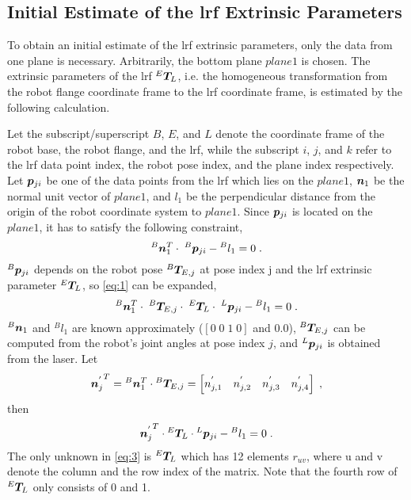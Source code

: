 \subsection{Initial Estimate of the \ac{lrf} Extrinsic Parameters}
\label{sec:first_step}
To obtain an initial estimate of the \ac{lrf} extrinsic parameters, only the data from one plane is necessary. Arbitrarily, the bottom plane $plane 1$ is chosen. The extrinsic parameters of the \ac{lrf} ${^E}\vb*{T}_L$, i.e. the homogeneous transformation from the robot flange coordinate frame to the \ac{lrf} coordinate frame, is estimated by the following calculation. 

Let the subscript/superscript $B$, $E$, and $L$ denote the coordinate frame of the robot base, the robot flange, and the \ac{lrf}, while the subscript $i$, $j$, and $k$ refer to the \ac{lrf} data point index, the robot pose index, and the plane index respectively. Let $\vb*{p}_{ji}$ be one of the data points from the \ac{lrf} which lies on the $plane 1$, $\vb*{n}_1$ be the normal unit vector of $plane 1$, and $l_1$ be the perpendicular distance from the origin of the robot coordinate system to $plane 1$.  Since $\vb*{p}_{ji}$ is located on the $plane 1$, it has to satisfy the following constraint, 
  \begin{equation}
  \label{eq:1}
  {^B}\vb*{n}_1 ^T \cdot\; {^B}\vb*{p}_{ji}  - {^B}l_1 = 0 \; .
   \end{equation}
${^B}\vb*{p}_{ji}$ depends on the robot pose ${^B}\vb*{T}_{E,j}$ at pose index j and the \ac{lrf} extrinsic parameter ${^E}\vb*{T}_L$, so \eqref{eq:1}  can be expanded,
  \begin{equation}
  {{^B}\vb*{n}_1 ^{T}} \cdot\; {^B}\vb*{T}_{E,j} \cdot \; {^E}\vb*{T}_L \cdot \; {^L}\vb*{p}_{ji}  - {^B}l_1 = 0 \; .
  \end{equation}
${^B}\vb*{n}_1$ and $^{B}l_1$ are known approximately ($[0 \; 0\; 1\;0]$ and $0.0$), ${^B}\vb*{T}_{E,j}$ can be computed from the robot's joint angles at pose index $j$, and ${^L}\vb*{p}_{ji}$ is obtained from the laser. Let 
\begin{equation}
{\vb*{n}_j^{'}}^{T} = {^B}\vb*{n}_1 ^T \cdot {^B}\vb*{T}_{E,j} = 
\left[n^{'}_{j,1} \quad n^{'}_{j,2} \quad n^{'}_{j,3}  \quad n^{'}_{j,4} \right] \; , 
\end{equation}
then  
  \begin{equation}
  \label{eq:3}
  {\vb*{n}_j^{'}} ^T \cdot {^E}\vb*{T}_L \cdot {^L}\vb*{p}_{ji} - {^B}l_1 = 0 \; .
  \end{equation}
The only unknown in \eqref{eq:3} is ${^E}\vb*{T}_L$ which has 12 elements $r_{uv}$, where u and v denote the column and the row index of the matrix. Note that the fourth row of ${^E}\vb*{T}_L$ only consists of 0 and 1. 

